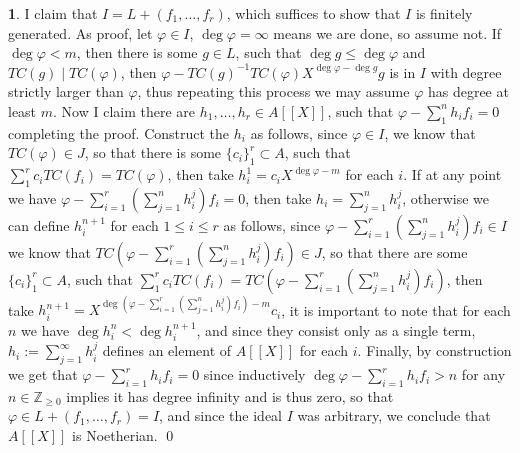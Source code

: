 \documentclass[11pt]{article}
\theoremstyle{definition}
\newtheorem{pb}{}
\newcommand{\set}[1]{\{#1\}}
\begin{document}
\begin{pb}
        I claim that \(I = L + (f_1,\hdots,f_r)\), which suffices to show that \(I\) is finitely generated. As proof, let \(\varphi \in I\), \(\deg \varphi = \infty\) means we are done, so assume not. If \(\deg \varphi < m\), then there is some \(g \in L\), such that \(\deg g \leq \deg \varphi\) and \(TC(g) \mid TC(\varphi)\), then \(\varphi - TC(g)^{-1}TC(\varphi)X^{\deg \varphi - \deg g}g\) is in \(I\) with degree strictly larger than \(\varphi\), thus repeating this process we may assume \(\varphi\) has degree at least \(m\). Now I claim there are \(h_1,\hdots,h_r \in A[[X]]\), such that \(\varphi - \sum_1^n h_if_i = 0\) completing the proof. Construct the \(h_i\) as follows, since \(\varphi \in I\), we know that \(TC(\varphi) \in J\), so that there is some \(\set{c_i}_1^r \subset A\), such that \(\sum_1^r c_i TC(f_i) = TC(\varphi)\), then take \(h_i^1 = c_i X^{\deg \varphi - m}\) for each \(i\). If at any point we have \(\varphi - \sum_{i = 1}^r \left(\sum_{j=1}^n h_i^j\right)f_i = 0\), then take \(h_i = \sum_{j=1}^n h_i^j\), otherwise we can define \(h_i^{n+1}\) for each \(1 \leq i \leq r\) as follows, since \(\varphi - \sum_{i = 1}^r \left(\sum_{j=1}^n h_i^j\right)f_i \in I\) we know that \(TC\left(\varphi - \sum_{i = 1}^r \left(\sum_{j=1}^n h_i^j\right)f_i\right) \in J\), so that there are some \(\set{c_i}_1^r \subset A\), such that \(\sum_1^r c_iTC(f_i) = TC\left(\varphi - \sum_{i = 1}^r \left(\sum_{j=1}^n h_i^j\right)f_i\right)\), then take \(h_i^{n+1} = X^{\deg \left(\varphi - \sum_{i = 1}^r \left(\sum_{j=1}^n h_i^j\right)f_i\right) - m}c_i\), it is important to note that for each \(n\) we have \(\deg h_i^n < \deg h_i^{n+1}\), and since they consist only as a single term, \(h_i := \sum_{j=1}^\infty h_i^j\) defines an element of \(A[[X]]\) for each \(i\). Finally, by construction we get that \(\varphi - \sum_{i=1}^r h_if_i = 0\) since inductively \(\deg \varphi - \sum_{i=1}^r h_if_i > n\) for any \(n \in \mathbb{Z}_{\geq 0}\) implies it has degree infinity and is thus zero, so that \(\varphi \in L + (f_1,\hdots,f_r) = I\), and since the ideal \(I\) was arbitrary, we conclude that \(A[[X]]\) is Noetherian. \qed
    \end{pb}
\end{document}
